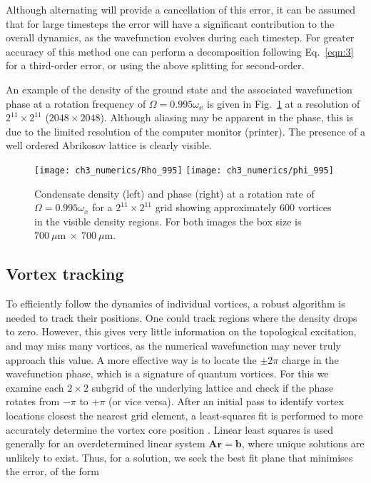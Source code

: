  Although alternating will provide a cancellation of this error, it can be assumed that for large timesteps the error will have a significant contribution to the overall dynamics, as the wavefunction evolves during each timestep. For greater accuracy of this method one can perform a decomposition following Eq.~\eqref{eqn:3} for a third-order error, or using the above splitting for second-order.

An example of the density of the ground state and the associated wavefunction phase at a rotation frequency of $\Omega = 0.995\omega_x$ is given in Fig.~\ref{fig:showingoff} at a resolution of $2^{11}\times 2^{11}$ ($2048\times 2048$). Although aliasing may be apparent in the phase, this is due to the limited resolution of the computer monitor (printer). The presence of a well ordered Abrikosov lattice is clearly visible.

 \begin{figure}
     \centering
     \texttt{[image: ch3\_numerics/Rho\_995]}
     \texttt{[image: ch3\_numerics/phi\_995]}
     \caption{Condensate density (left) and phase (right) at a rotation rate of $\Omega=0.995\omega_x$ for a $2^{11}\times 2^{11}$ grid showing approximately 600 vortices in the visible density regions. For both images the box size is $700~\mu\textrm{m} ~\times ~700~\mu\textrm{m}$.}
     \label{fig:showingoff}
 \end{figure}

 \subsection{Vortex tracking}\label{sec:vortrack}
 To efficiently follow the dynamics of individual vortices, a robust algorithm is needed to track their positions. One could track regions where the density drops to zero. However, this gives very little information on the topological excitation, and may miss many vortices, as the numerical wavefunction may never truly approach this value. A more effective way is to locate the $\pm 2\pi$ charge in the wavefunction phase, which is a signature of quantum vortices. For this we examine each $2\times 2$ subgrid of the underlying lattice and check if the phase rotates from $-\pi$ to $+\pi$ (or vice versa). After an initial pass to identify vortex locations closest the nearest grid element, a least-squares fit is performed to more accurately determine the vortex core position \cite{c42f}. Linear least squares is used generally for an overdetermined linear system $\mathbf{A}\mathbf{r} = \mathbf{b}$, where unique solutions are unlikely to exist. Thus, for a solution, we seek the best fit plane that minimises the error, of the form

